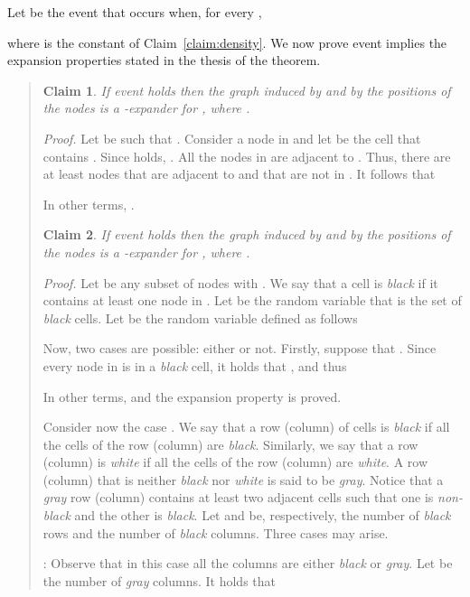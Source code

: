 \documentclass[10pt,a4paper]{article}
\newtheorem{claim}{Claim}
\newcommand{\proof}{\noindent\textit{Proof. }}
\newcommand{\qed}{\hspace{\stretch{1}}}
\begin{document}
\noindent Let  be the event that occurs when, for every ,

where  is the constant of Claim~\ref{claim:density}. We now prove event  implies
the expansion properties stated in the thesis of the theorem.


\begin{quote}
\begin{claim}\label{claim:exp1}
If event  holds then the graph induced by  and by the positions of the nodes is a -expander for , where .
\end{claim}
\proof Let  be such that . Consider a node   in  and
let  be the cell that contains . Since  holds, . All the nodes in  are adjacent to . Thus, there are at least
 nodes that are adjacent to  and that are not in . It follows that
\begin{small}  \end{small}
In other terms, .
\qed

\begin{claim}\label{claim:exp2}
If event  holds then the graph induced by  and by the positions of
the nodes is a -expander for ,
where .
\end{claim}
\proof Let  be any subset of nodes with . We say that a cell is
\emph{black} if it contains at least one node in . Let  be the random variable that is the set of \emph{black} cells. Let  be the random variable defined as follows

Now, two cases are possible: either  or not. Firstly, suppose that
. Since every node in  is in a \emph{black} cell, it holds that
, and thus
\begin{small}  \end{small}
In other terms,  and the expansion property is proved.

\noindent Consider now the case . We say that a row (column) of cells is
\emph{black} if all the cells of the row (column) are \emph{black}. Similarly, we say that a row
(column) is \emph{white} if all the cells of the row (column) are \emph{white}. A row (column) that is
neither \emph{black} nor \emph{white} is said to be \emph{gray}. Notice that a \emph{gray} row
(column) contains at least two adjacent cells such that one is \emph{non-black} and the other is
\emph{black}. Let  and  be, respectively, the number of \emph{black} rows and the number of
\emph{black} columns. Three cases may arise.

\smallskip \noindent
[]: Observe that in this case all the columns are either \emph{black} or \emph{gray}.
Let  be the number of \emph{gray} columns.  It holds that


\end{quote}
\end{document}
